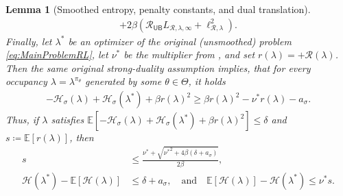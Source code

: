 \documentclass{article}
\theoremstyle{plain}
\newtheorem{lemma}[theorem]{Lemma}
\theoremstyle{definition}
\theoremstyle{remark}
\newcommand{\Exp}[1]{{ \mathbb{E}}\!\left[#1\right]}
\DeclarePairedDelimiter{\plus}{[}{]_{+}}
\newcommand{\define}{\coloneqq}
\def\nuOpt{{\nu^{*}}}
\def\HH{{\mathcal{H}}}
\def\RegMax{{\mathcal{R}_{\mathsf{UB}}}}
\def\Reg{{\mathcal{R}}}
\begin{document}
\begin{lemma}[Smoothed entropy, penalty constants, and dual translation]
\begin{align}
  +2\beta\left(\RegMax L_{\Reg,\lambda,\infty}
  +\ell_{\Reg,\lambda}^2\right).
  \label{eq:SmoothedPenaltyL1Constant}
 \end{align}
 Finally, let $\lambda^*$ be an optimizer of the original (unsmoothed)
 problem \eqref{eq:MainProblemRL}, let $\nuOpt$ be the multiplier from
 , and set $r(\lambda)=\plus{\Reg(\lambda)}$.
 Then the same original strong-duality assumption implies, that for every
 occupancy $\lambda=\lambda^{\pi_\theta}$ generated by some
 $\theta\in\Theta$, it holds
 \begin{align}
  -\HH_\sigma(\lambda)+\HH_\sigma(\lambda^*)
  +\beta r(\lambda)^2
  \geq\beta r(\lambda)^2-\nuOpt r(\lambda)-a_\sigma.
  \label{eq:SmoothedPenaltyDualLowerBound}
 \end{align}
 Thus, if $\lambda$ satisfies
 $\Exp{-\HH_\sigma(\lambda)+\HH_\sigma(\lambda^*)
   +\beta r(\lambda)^2}\leq\delta$ and
 $s\define\Exp{r(\lambda)}$, then
 \begin{align}
  s
   & \leq\frac{\nuOpt+
   \sqrt{\nuOpt^2+4\beta(\delta+a_\sigma)}}{2\beta},
  \label{eq:SmoothedConstraintTranslation}       \\
  \HH(\lambda^*)-\Exp{\HH(\lambda)}
   & \leq\delta+a_\sigma, \quad \text{and} \quad
  \Exp{\HH(\lambda)}-\HH(\lambda^*)
  \leq\nuOpt s.
  \label{eq:SmoothedObjectiveTranslation}
 \end{align}
\end{lemma}
\end{document}
